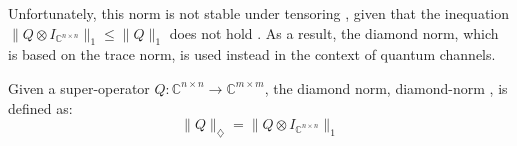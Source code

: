 


Unfortunately, this norm is not stable under tensoring , given that the inequation $ \lVert Q \otimes I_{\mathbb{C}^{n\times n}} \rVert_{1} \leq \lVert Q \rVert_{1}$ does not hold \cite{watrous2018theory}. As a result, the diamond norm, which is based on the trace norm, is used instead in the context of quantum channels. 

\begin{definition}
  Given a super-operator $Q: \mathbb{C}^{n\times n} \xrightarrow{} \mathbb{C}^{m\times m }$, the diamond norm, \gls{diamond-norm} , is defined as:
  \begin{equation}  \label{eq:diamond_distance}
    \lVert Q \rVert_{\diamondsuit} =  \lVert Q \otimes I_{\mathbb{C}^{n \times n}} \rVert_{1}
  \end{equation}
\end{definition}

